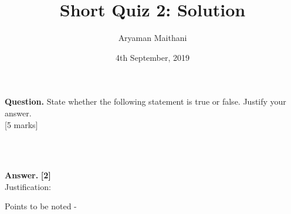 \documentclass{article}
\title{Short Quiz 2: Solution}      %
\author{Aryaman Maithani}
\date{4th September, 2019}  		 %
\begin{document}
\maketitle

\hrulefill

\textbf{Question.} State whether the following statement is true or false. Justify your answer.\\ 
\hfill [5 marks]
\begin{flushright}
	\\~\\
\end{flushright}

\hrulefill

\textbf{Answer.}  \hfill \textbf{[2]}\\  %
Justification: 

\hrulefill

\vspace{0.2 cm}

Points to be noted -
\begin{enumerate} 
\end{enumerate}
\end{document}
